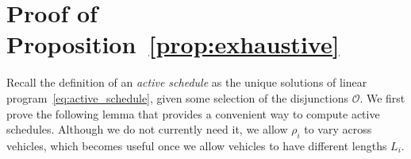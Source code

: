 \documentclass[a4paper]{article}
\theoremstyle{definition}
\theoremstyle{plain}
\newtheorem{proposition}{Proposition}
\begin{document}













\newpage

\appendix

\section{Proof of Proposition~\ref{prop:exhaustive}}\label{app:proof}

Recall the definition of an \textit{active schedule} as the unique solutions of
linear program~\eqref{eq:active_schedule}, given some selection of the
disjunctions $\mathcal{O}$. We first prove the following lemma that provides a
convenient way to compute active schedules. Although we do not currently need
it, we allow $\rho_{i}$ to vary across vehicles, which becomes useful once we
allow vehicles to have different lengths $L_{i}$.
\end{document}
